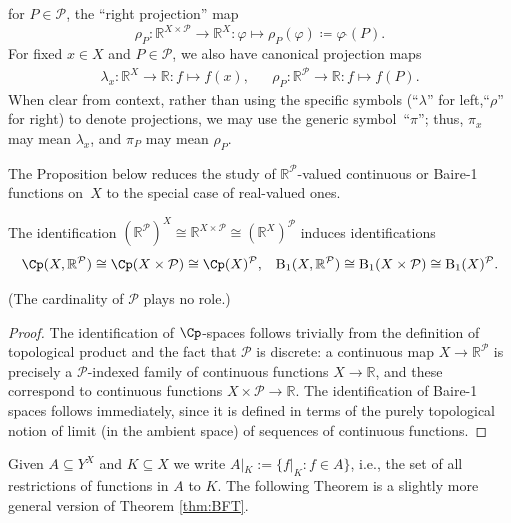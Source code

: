 for $P\in \mathcal{P}$, the ``right projection'' map
\begin{equation*}
    \rho_P\colon \mathbb{R}^{X\times\mathcal{P}}\to \mathbb{R}^X: \varphi\mapsto \rho_P(\varphi)\coloneqq \varphi\,\hat{}(P).
\end{equation*}
For fixed $x\in X$ and $P\in \mathcal{P}$, we also have canonical projection maps
\begin{align*}
    \lambda_x\colon \mathbb{R}^X\to \mathbb{R}: f\mapsto f(x), &&
    \rho_P\colon \mathbb{R}^{\mathcal{P}}\to \mathbb{R}: f\mapsto f(P).
\end{align*}
When clear from context, rather than using the specific symbols (``$\lambda$'' for left,``$\rho$'' for right) to denote projections, we may use the generic symbol~``$\pi$'';
thus, $\pi_x$ may mean $\lambda_x$, and $\pi_P$ may mean $\rho_P$.

The Proposition below reduces the study of $\mathbb{R}^{\mathcal{P}}$-valued continuous or Baire-1 functions on~$X$ to the special case of real-valued ones.

\begin{proposition}\label{prop:Baire-identifications}
    The identification $(\mathbb{R}^{\mathcal{P}})^X \cong \mathbb{R}^{X\times \mathcal{P}} \cong (\mathbb{R}^X)^{\mathcal{P}}$ induces identifications
    \begin{align*}
        \Cp(X, \mathbb{R}^{\mathcal{P}}) \cong \Cp(X\times \mathcal{P}) \cong \Cp(X)^{\mathcal{P}}, &&
        \mathrm{B}_1(X, \mathbb{R}^{\mathcal{P}}) \cong \mathrm{B}_1(X\times \mathcal{P}) \cong \mathrm{B}_1(X)^{\mathcal{P}}.
    \end{align*}
\end{proposition}

(The cardinality of $\mathcal{P}$ plays no role.)

\begin{proof}
    The identification of $\Cp$-spaces follows trivially from the definition of topological product and the fact that $\mathcal{P}$ is discrete: a continuous map $X\to \mathbb{R}^{\mathcal{P}}$ is precisely a $\mathcal{P}$-indexed family of continuous functions $X\to \mathbb{R}$, and these correspond to continuous functions $X\times \mathcal{P}\to \mathbb{R}$.
    The identification of Baire-1 spaces follows immediately, since it is defined in terms of the purely topological notion of limit (in the ambient space) of sequences of continuous functions.
\end{proof}

Given $A\subseteq Y^X$ and $K\subseteq X$ we write $A|_K:=\{f|_K:f\in A\}$, i.e., the set of all restrictions of functions in $A$ to $K$.
The following Theorem is a slightly more general version of Theorem \ref{thm:BFT}.

